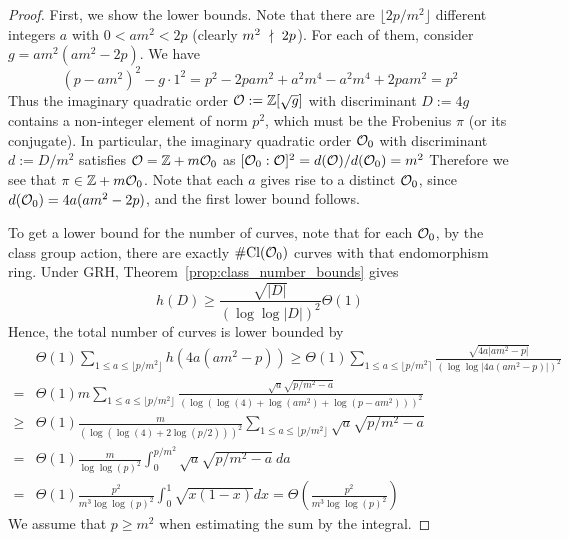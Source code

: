 \begin{proof}
    First, we show the lower bounds.
    Note that there are $\lfloor 2p/m^2 \rfloor$ different integers $a$ with $0 < am^2 < 2p$ (clearly $m^2 \ \nmid \  2p$).
    For each of them, consider $g = am^2(am^2 - 2p)$.
    We have
    \begin{equation*}
        (p - am^2)^2 - g \cdot 1^2 = p^2 - 2pam^2 + a^2m^4 - a^2m^4 + 2pam^2 = p^2
    \end{equation*}
    Thus the imaginary quadratic order $\mathcal{O} := \mathbb{Z}[\sqrt{g}]$ with discriminant $D := 4g$ contains a non-integer element of norm $p^2$, which must be the Frobenius $\pi$ (or its conjugate).
    In particular, the imaginary quadratic order $\mathcal{O}_0$ with discriminant $d := D/m^2$ satisfies $\mathcal{O} = \mathbb{Z} + m\mathcal{O}_0$ as $[\mathcal{O}_0 : \mathcal{O}]^2 = d(\mathcal{O})/d(\mathcal{O}_0) = m^2$
    Therefore we see that $\pi \in \mathbb{Z} + m\mathcal{O}_0$.
    Note that each $a$ gives rise to a distinct $\mathcal{O}_0$, since $d(\mathcal{O}_0) = 4a(am^2 - 2p)$, and the first lower bound follows.

    To get a lower bound for the number of curves, note that for each $\mathcal{O}_0$, by the class group action, there are exactly $\#\mathrm{Cl}(\mathcal{O}_0)$ curves with that endomorphism ring.
    Under GRH, Theorem~\ref{prop:class_number_bounds} gives
    \begin{equation*}
        h(D) \geq \frac {\sqrt{|D|}} {(\log\log|D|)^2} \Theta(1)
    \end{equation*}
    Hence, the total number of curves is lower bounded by
    \begin{align*}
        &\Theta(1) \sum_{1 \leq a \leq \lfloor p/m^2 \rfloor} h(4a(am^2 - p)) \geq \Theta(1) \sum_{1 \leq a \leq \lfloor p/m^2 \rceil} \frac {\sqrt{4a|am^2 - p|}} {(\log\log|4a(am^2 - p)|)^2} \\
        =& \Theta(1) m \sum_{1 \leq a \leq \lfloor p/m^2 \rfloor} \frac {\sqrt{a} \sqrt{p/m^2 - a}} {(\log(\log(4) + \log(am^2) + \log(p - am^2)))^2} \\
        \geq& \Theta(1) \frac {m} {(\log(\log(4) + 2\log(p/2)))^2} \sum_{1 \leq a \leq \lfloor p/m^2 \rfloor} \sqrt{a} \sqrt{p/m^2 - a} \\
        =& \Theta(1) \frac {m} {\log\log(p)^2} \int_0^{p/m^2} \sqrt{a} \sqrt{p/m^2 - a} \ da \\
        =& \Theta(1) \frac {p^2} {m^3 \log\log(p)^2} \int_0^1 \sqrt{x(1 - x)} dx = \Theta\left( \frac {p^2} {m^3 \log\log(p)^2} \right)
    \end{align*}
    We assume that $p \geq m^2$ when estimating the sum by the integral.


\end{proof}

